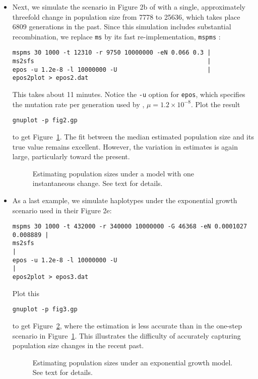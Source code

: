\documentclass[a4paper]{article}
\newcommand{\ty}{\texttt}
\begin{document}
\begin{itemize}
\item Next, we simulate the scenario in Figure 2b of \cite{liu15:exp}
  with a single, approximately threefold change in population size
  from 7778 to 25636, which takes place 6809 generations in the
  past. Since this simulation includes substantial recombination, we
  replace \ty{ms} by its fast re-implementation, \ty{mspms}
  \citep{kel16:eff}:
\begin{verbatim}
mspms 30 1000 -t 12310 -r 9750 10000000 -eN 0.066 0.3 |
ms2sfs                                                |
epos -u 1.2e-8 -l 10000000 -U                         |
epos2plot > epos2.dat
\end{verbatim}
This takes about 11 minutes. Notice the \ty{-u} option for \ty{epos},
which specifies the mutation rate per generation used by \cite{liu15:exp}, $\mu=1.2\times
10^{-8}$. Plot the result
\begin{verbatim}
gnuplot -p fig2.gp
\end{verbatim}
to get Figure~\ref{fig:2b}. The fit between the median estimated
population size and its true value remains excellent. However, the
variation in estimates is again large, particularly toward the present.
\begin{figure}
  \begin{center}
    \scalebox{0.6}{}
  \end{center}
  \caption{Estimating population sizes under a model with one
    instantaneous change. See text for details.}\label{fig:2b}
\end{figure}
\item As a last example, we simulate haplotypes under
  the exponential growth scenario \cite{liu15:exp} used in their
  Figure 2e:
    \small
\begin{verbatim}
mspms 30 1000 -t 432000 -r 340000 10000000 -G 46368 -eN 0.0001027 0.008889 |
ms2sfs                                                                     |
epos -u 1.2e-8 -l 10000000 -U                                              |
epos2plot > epos3.dat
\end{verbatim}
\normalsize
Plot this
\begin{verbatim}
gnuplot -p fig3.gp
\end{verbatim}
to get Figure~\ref{fig:2e}, where the estimation is less
accurate than in the one-step scenario in Figure~\ref{fig:2b}.
This illustrates the difficulty of accurately capturing population size
changes in the recent past.
\begin{figure}
  \begin{center}
    \scalebox{0.6}{}
  \end{center}
  \caption{Estimating population sizes under an exponential growth
    model. See text for details.}\label{fig:2e}
\end{figure}
\end{itemize}
\end{document}
